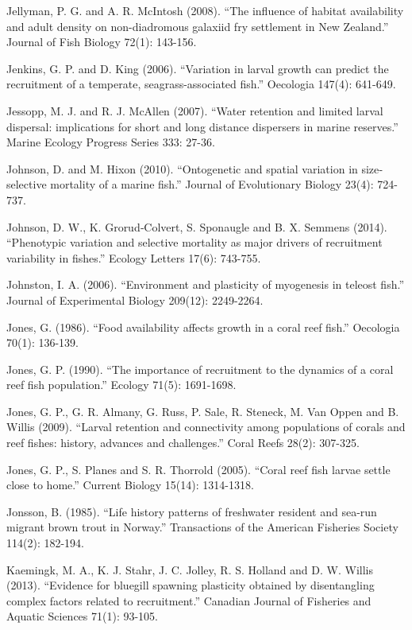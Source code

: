 \documentclass[]{book}
\begin{document}
Jellyman, P. G. and A. R. McIntosh (2008). ``The influence of habitat
availability and adult density on non-diadromous galaxiid fry settlement
in New Zealand.'' Journal of Fish Biology 72(1): 143-156.

Jenkins, G. P. and D. King (2006). ``Variation in larval growth can
predict the recruitment of a temperate, seagrass-associated fish.''
Oecologia 147(4): 641-649.

Jessopp, M. J. and R. J. McAllen (2007). ``Water retention and limited
larval dispersal: implications for short and long distance dispersers in
marine reserves.'' Marine Ecology Progress Series 333: 27-36.

Johnson, D. and M. Hixon (2010). ``Ontogenetic and spatial variation in
size‐selective mortality of a marine fish.'' Journal of Evolutionary
Biology 23(4): 724-737.

Johnson, D. W., K. Grorud‐Colvert, S. Sponaugle and B. X. Semmens
(2014). ``Phenotypic variation and selective mortality as major drivers
of recruitment variability in fishes.'' Ecology Letters 17(6): 743-755.

Johnston, I. A. (2006). ``Environment and plasticity of myogenesis in
teleost fish.'' Journal of Experimental Biology 209(12): 2249-2264.

Jones, G. (1986). ``Food availability affects growth in a coral reef
fish.'' Oecologia 70(1): 136-139.

Jones, G. P. (1990). ``The importance of recruitment to the dynamics of
a coral reef fish population.'' Ecology 71(5): 1691-1698.

Jones, G. P., G. R. Almany, G. Russ, P. Sale, R. Steneck, M. Van Oppen
and B. Willis (2009). ``Larval retention and connectivity among
populations of corals and reef fishes: history, advances and
challenges.'' Coral Reefs 28(2): 307-325.

Jones, G. P., S. Planes and S. R. Thorrold (2005). ``Coral reef fish
larvae settle close to home.'' Current Biology 15(14): 1314-1318.

Jonsson, B. (1985). ``Life history patterns of freshwater resident and
sea-run migrant brown trout in Norway.'' Transactions of the American
Fisheries Society 114(2): 182-194.

Kaemingk, M. A., K. J. Stahr, J. C. Jolley, R. S. Holland and D. W.
Willis (2013). ``Evidence for bluegill spawning plasticity obtained by
disentangling complex factors related to recruitment.'' Canadian Journal
of Fisheries and Aquatic Sciences 71(1): 93-105.
\end{document}
